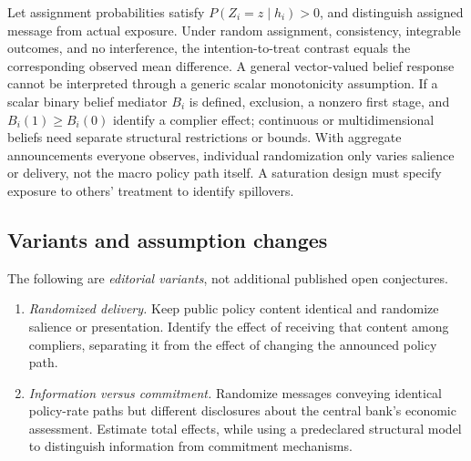 \documentclass[11pt,a4paper]{article}
\begin{document}
Let assignment probabilities satisfy \(P(Z_i=z\mid h_i)>0\), and distinguish assigned message from actual exposure. Under random assignment, consistency, integrable outcomes, and no interference, the intention-to-treat contrast equals the corresponding observed mean difference. A general vector-valued belief response cannot be interpreted through a generic scalar monotonicity assumption. If a scalar binary belief mediator \(B_i\) is defined, exclusion, a nonzero first stage, and \(B_i(1)\ge B_i(0)\) identify a complier effect; continuous or multidimensional beliefs need separate structural restrictions or bounds. With aggregate announcements everyone observes, individual randomization only varies salience or delivery, not the macro policy path itself. A saturation design must specify exposure to others' treatment to identify spillovers.
\subsection*{Variants and assumption changes}
The following are \emph{editorial variants}, not additional published open conjectures.
\begin{enumerate}
\item \emph{Randomized delivery.} Keep public policy content identical and randomize salience or presentation. Identify the effect of receiving that content among compliers, separating it from the effect of changing the announced policy path.
\item \emph{Information versus commitment.} Randomize messages conveying identical policy-rate paths but different disclosures about the central bank's economic assessment. Estimate total effects, while using a predeclared structural model to distinguish information from commitment mechanisms.
\end{enumerate}
\end{document}
